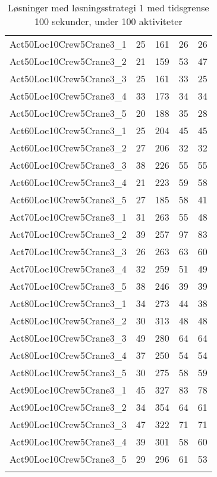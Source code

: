 {\begin{center}
\begin{longtable}{ | l | c | c | c | c | }
Act50Loc10Crew5Crane3\_1	&	25	&	161	&	26	&	26	\\
Act50Loc10Crew5Crane3\_2	&	21	&	159	&	53	&	47	\\
Act50Loc10Crew5Crane3\_3	&	25	&	161	&	33	&	25	\\
Act50Loc10Crew5Crane3\_4	&	33	&	173	&	34	&	34	\\
Act50Loc10Crew5Crane3\_5	&	20	&	188	&	35	&	28	\\
Act60Loc10Crew5Crane3\_1	&	25	&	204	&	45	&	45	\\
Act60Loc10Crew5Crane3\_2	&	27	&	206	&	32	&	32	\\
Act60Loc10Crew5Crane3\_3	&	38	&	226	&	55	&	55	\\
Act60Loc10Crew5Crane3\_4	&	21	&	223	&	59	&	58	\\
Act60Loc10Crew5Crane3\_5	&	27	&	185	&	58	&	41	\\
Act70Loc10Crew5Crane3\_1	&	31	&	263	&	55	&	48	\\
Act70Loc10Crew5Crane3\_2	&	39	&	257	&	97	&	83	\\
Act70Loc10Crew5Crane3\_3	&	26	&	263	&	63	&	60	\\
Act70Loc10Crew5Crane3\_4	&	32	&	259	&	51	&	49	\\
Act70Loc10Crew5Crane3\_5	&	38	&	246	&	39	&	39	\\
Act80Loc10Crew5Crane3\_1	&	34	&	273	&	44	&	38	\\
Act80Loc10Crew5Crane3\_2	&	30	&	313	&	48	&	48	\\
Act80Loc10Crew5Crane3\_3	&	49	&	280	&	64	&	64	\\
Act80Loc10Crew5Crane3\_4	&	37	&	250	&	54	&	54	\\
Act80Loc10Crew5Crane3\_5	&	30	&	275	&	58	&	59	\\
Act90Loc10Crew5Crane3\_1	&	45	&	327	&	83	&	78	\\
Act90Loc10Crew5Crane3\_2	&	34	&	354	&	64	&	61	\\
Act90Loc10Crew5Crane3\_3	&	47	&	322	&	71	&	71	\\
Act90Loc10Crew5Crane3\_4	&	39	&	301	&	58	&	60	\\
Act90Loc10Crew5Crane3\_5	&	29	&	296	&	61	&	53	\\
\hline					
\caption{Løsninger med løsningsstrategi 1 med tidsgrense 100 sekunder, under 100 aktiviteter}														
\label{tab:solutionAssignAltRFSTF100s}					
\end{longtable}									
\end{center}	

}
